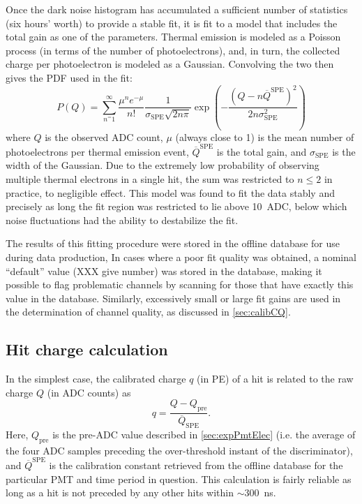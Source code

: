 \documentclass[../thesis.tex]{subfiles}
\begin{document}
Once the dark noise histogram has accumulated a sufficient number of statistics
(six hours' worth) to provide a stable fit, it is fit to a model that includes
the total gain as one of the parameters. Thermal emission is modeled as a
Poisson process (in terms of the number of photoelectrons), and, in turn, the
collected charge per photoelectron is modeled as a Gaussian. Convolving the two
then gives the PDF used in the fit:
\begin{equation*}
  P(Q) = \sum_{n^=1}^{\infty} \frac{\mu^n e^{-\mu}}{n!} \frac{1}{\sigma_{\mathrm{SPE}}\sqrt{2n\pi}} \exp\left(-\frac{(Q - n\overline Q^{\mathrm{SPE}})^2}{2n\sigma_{\mathrm{SPE}}^2}\right)
\end{equation*}
where $Q$ is the observed ADC count, $\mu$ (always close to 1) is the mean
number of photoelectrons per thermal emission event, $\overline
Q^{\mathrm{SPE}}$ is the total gain, and $\sigma_{\mathrm{SPE}}$ is the width of
the Gaussian. Due to the extremely low probability of observing multiple thermal
electrons in a single hit, the sum was restricted to $n \le 2$ in practice, to
negligible effect. This model was found to fit the data stably and precisely as
long the fit region was restricted to lie above 10~ADC, below which noise
fluctuations had the ability to destabilize the fit.

The results of this fitting procedure were stored in the offline database for
use during data production, In cases where a poor fit quality was obtained, a
nominal ``default'' value (XXX give number) was stored in the database, making
it possible to flag problematic channels by scanning for those that have exactly
this value in the database. Similarly, excessively small or large fit gains are
used in the determination of channel quality, as discussed in
\autoref{sec:calibCQ}.

\subsection{Hit charge calculation}
\label{sec:calibHitCharge}

In the simplest case, the calibrated charge $q$ (in PE) of a hit is related to
the raw charge $Q$ (in ADC counts) as
\begin{equation}
  \label{eq:corrChg}
  q = \frac{Q - Q_{\mathrm{pre}}}{\overline Q_{\mathrm{SPE}}}.
\end{equation}
Here, $Q_{\mathrm{pre}}$ is the pre-ADC value described in
\autoref{sec:expPmtElec} (i.e. the average of the four ADC samples preceding the
over-threshold instant of the discriminator), and $\overline Q^{\mathrm{SPE}}$
is the calibration constant retrieved from the offline database for the
particular PMT and time period in question. This calculation is fairly reliable
as long as a hit is not preceded by any other hits within $\sim$300~ns.
\end{document}
